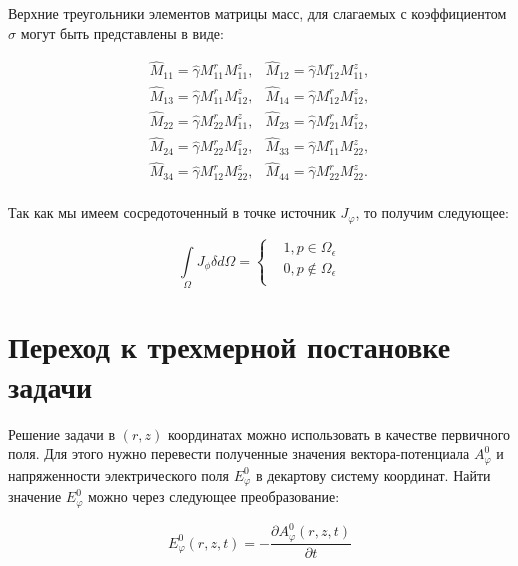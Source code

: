 Верхние треугольники элементов матрицы масс, для слагаемых с коэффициентом $\sigma$ могут быть представлены в виде:

\begin{equation*}
	\begin{array}{ll}
		\hat{M}_{11} = \hat{\gamma}M^{r}_{11}M^z_{11}, & \hat{M}_{12} = \hat{\gamma}M^{r}_{12}M^z_{11},\\
		\hat{M}_{13} = \hat{\gamma}M^{r}_{11}M^z_{12}, & \hat{M}_{14} = \hat{\gamma}M^{r}_{12}M^z_{12},\\
		\hat{M}_{22} = \hat{\gamma}M^{r}_{22}M^z_{11}, & \hat{M}_{23} = \hat{\gamma}M^{r}_{21}M^z_{12},\\
		\hat{M}_{24} = \hat{\gamma}M^{r}_{22}M^z_{12}, & \hat{M}_{33} = \hat{\gamma}M^{r}_{11}M^z_{22},\\
		\hat{M}_{34} = \hat{\gamma}M^{r}_{12}M^z_{22}, & \hat{M}_{44} = \hat{\gamma}M^{r}_{22}M^z_{22}.\\
	\end{array}
\end{equation*}

Так как мы имеем сосредоточенный в точке источник $J_{\varphi}$, то получим следующее:

\begin{equation} \label{eq_1_7}
	\int \limits_{\Omega} J_{\phi} \delta d \Omega = 
		\left \{ \begin{aligned}
			& 1, p \in \Omega_{\epsilon}\\
			& 0,    p \notin \Omega_{\epsilon}\\
		\end{aligned} \right.
\end{equation}

\section{Переход к трехмерной постановке задачи}

Решение задачи в $(r, z)$ координатах можно использовать в качестве первичного поля. Для этого нужно перевести полученные значения вектора-потенциала $A^0_{\varphi}$ и напряженности электрического поля  $E^0_{\varphi}$ в декартову систему координат. Найти значение $E^0_{\varphi}$ можно через следующее преобразование:

\begin{equation} \label{eq_1_8}
	E^0_{\varphi}(r, z, t) = -\frac{\partial A^0_{\varphi}(r, z, t)}{\partial t}
\end{equation}

